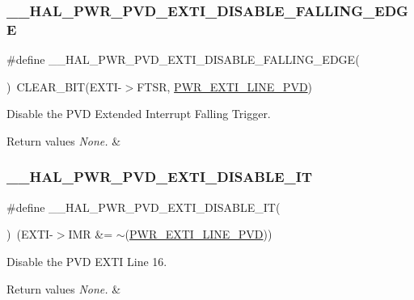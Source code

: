 \subsubsection{\texorpdfstring{\_\_HAL\_PWR\_PVD\_EXTI\_DISABLE\_FALLING\_EDGE}{\_\_HAL\_PWR\_PVD\_EXTI\_DISABLE\_FALLING\_EDGE}}
{\footnotesize\ttfamily \#define \+\_\+\+\_\+\+H\+A\+L\+\_\+\+P\+W\+R\+\_\+\+P\+V\+D\+\_\+\+E\+X\+T\+I\+\_\+\+D\+I\+S\+A\+B\+L\+E\+\_\+\+F\+A\+L\+L\+I\+N\+G\+\_\+\+E\+D\+GE(\begin{DoxyParamCaption}{ }\end{DoxyParamCaption})~C\+L\+E\+A\+R\+\_\+\+B\+IT(E\+X\+TI-\/$>$F\+T\+SR, \mbox{\hyperlink{group___p_w_r___p_v_d___e_x_t_i___line_ga43a49255649e03d2d2b6b12c5c379d2b}{P\+W\+R\+\_\+\+E\+X\+T\+I\+\_\+\+L\+I\+N\+E\+\_\+\+P\+VD}})}



Disable the P\+VD Extended Interrupt Falling Trigger. 


\begin{DoxyRetVals}{Return values}
{\em None.} & \\
\hline
\end{DoxyRetVals}
\mbox{\label{group___p_w_r___exported___macro_gad240d7bf8f15191b068497b9aead1f1f}} 
\subsubsection{\texorpdfstring{\_\_HAL\_PWR\_PVD\_EXTI\_DISABLE\_IT}{\_\_HAL\_PWR\_PVD\_EXTI\_DISABLE\_IT}}
{\footnotesize\ttfamily \#define \+\_\+\+\_\+\+H\+A\+L\+\_\+\+P\+W\+R\+\_\+\+P\+V\+D\+\_\+\+E\+X\+T\+I\+\_\+\+D\+I\+S\+A\+B\+L\+E\+\_\+\+IT(\begin{DoxyParamCaption}{ }\end{DoxyParamCaption})~(E\+X\+TI-\/$>$I\+MR \&= $\sim$(\mbox{\hyperlink{group___p_w_r___p_v_d___e_x_t_i___line_ga43a49255649e03d2d2b6b12c5c379d2b}{P\+W\+R\+\_\+\+E\+X\+T\+I\+\_\+\+L\+I\+N\+E\+\_\+\+P\+VD}}))}



Disable the P\+VD E\+X\+TI Line 16. 


\begin{DoxyRetVals}{Return values}
{\em None.} & \\
\hline
\end{DoxyRetVals}
\mbox{\label{group___p_w_r___exported___macro_ga1ca8fd7f3286a176f6be540c75a004c6}} 
